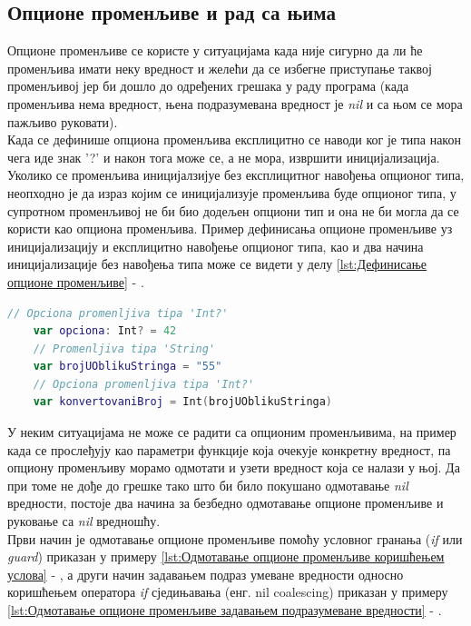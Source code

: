 \documentclass[12pt,oneside]{memoir}
\begin{document}
\subsection{Опционе променљиве и рад са њима}

\indent Опционе променљиве се користе у ситуацијама када није сигурно да ли ће променљива имати неку вредност и желећи да се избегне приступање таквој променљивој јер би дошло до одређених грешака у раду програма (када променљива нема вредност, њена подразумевана вредност је \textit{nil} и са њом се мора пажљиво руковати).
\\
\indent Када се дефинише опциона променљива експлицитно се наводи ког је типа након чега иде знак '?' и након тога може се, а не мора, извршити иницијализација. Уколико се променљива иницијалзијуе без експлицитног навођења опционог типа, неопходно је да израз којим се иницијализује променљива буде опционог типа, у супротном променљивој не би био додељен опциони тип и она не би могла да се користи као опциона променљива. Пример дефинисања опционе променљиве уз иницијализацију и експлицитно навођење опционог типа, као и два начина иницијализације без навођења типа може се видети у делу \ref{lst:Дефинисање опционе променљиве} - .

\begin{lstlisting}[caption=\textit{{Дефинисање опционе променљиве}}, label={lst:Дефинисање опционе променљиве}, language=Swift, frame=single]
    // Opciona promenljiva tipa 'Int?'
    var opciona: Int? = 42
    // Promenljiva tipa 'String'
    var brojUOblikuStringa = "55"
    // Opciona promenljiva tipa 'Int?'
    var konvertovaniBroj = Int(brojUOblikuStringa)
\end{lstlisting}

\indent У неким ситуацијама не може се радити са опционим променљивима, на пример када се прослеђују као параметри функције која очекује конкретну вредност, па опциону променљиву морамо одмотати и узети вредност која се налази у њој. Да при томе не дође до грешке тако што би било покушано одмотавање \textit{nil} вредности, постоје два начина за безбедно одмотавање опционе променљиве и руковање са \textit{nil} вредношћу.
\\
\indent Први начин је одмотавање опционе променљиве помоћу условног гранања (\textit{if} или \textit{guard}) приказан у примеру \ref{lst:Одмотавање опционе променљиве коришћењем услова} - , а други начин задавањем подраз умеване вредности односно коришћењем оператора \textit{if} сједињавања (енг. nil coalescing) приказан у примеру \ref{lst:Одмотавање опционе променљиве задавањем подразумеване вредности} - .
\end{document}
